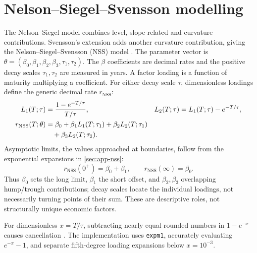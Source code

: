 \chapter{Nelson--Siegel--Svensson modelling}\label{ch:nss}
\label{sec:nss-background}\label{sec:nss-equations}
The Nelson--Siegel model combines level, slope-related and curvature contributions. Svensson's extension adds another curvature contribution, giving the Nelson--Siegel--Svensson (NSS) model \parencite{nelson1987,svensson1994}. The parameter vector is
\(\theta=(\beta_0,\beta_1,\beta_2,\beta_3,\tau_1,\tau_2)\).
The \(\beta\) coefficients are decimal rates and the positive decay scales \(\tau_1,\tau_2\) are measured in years. A factor loading is a function of maturity multiplying a coefficient. For either decay scale \(\tau\), dimensionless loadings define the generic decimal rate \(r_{\mathrm{NSS}}\):
\begin{align}
L_1(T;\tau)&=\frac{1-e^{-T/\tau}}{T/\tau},&
L_2(T;\tau)&=L_1(T;\tau)-e^{-T/\tau},\label{eq:loadings}\\
r_{\mathrm{NSS}}(T;\theta)&=\beta_0+\beta_1L_1(T;\tau_1)
+\beta_2L_2(T;\tau_1)\notag\\
&\quad+\beta_3L_2(T;\tau_2).\label{eq:nss}
\end{align}
\label{sec:nss-limits}
Asymptotic limits, the values approached at boundaries, follow from the exponential expansions in \cref{sec:app-nss}:
\begin{equation}\label{eq:nss-limits}
r_{\mathrm{NSS}}(0^+)=\beta_0+\beta_1,\qquad
r_{\mathrm{NSS}}(\infty)=\beta_0.
\end{equation}
Thus \(\beta_0\) sets the long limit, \(\beta_1\) the short offset, and \(\beta_2,\beta_3\) overlapping hump/trough contributions; decay scales locate the individual loadings, not necessarily turning points of their sum. These are descriptive roles, not structurally unique economic factors.

\label{sec:nss-stability}
For dimensionless \(x=T/\tau\), subtracting nearly equal rounded numbers in \(1-e^{-x}\) causes cancellation \parencite{higham2002}. The implementation uses \texttt{expm1}, accurately evaluating \(e^{-x}-1\), and separate fifth-degree loading expansions below \(x=10^{-3}\).

